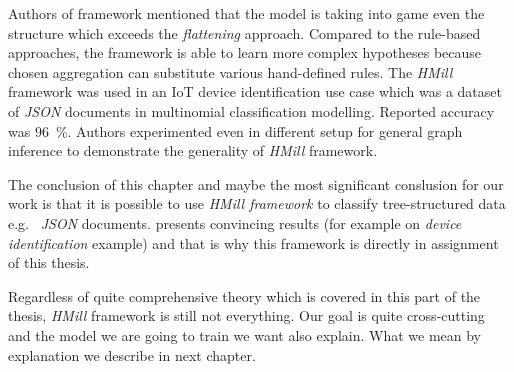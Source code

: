 
Authors of framework mentioned that the model is taking into game even the structure which exceeds the \emph{flattening} approach. Compared to the rule-based approaches, the framework is able to learn more complex hypotheses because chosen aggregation can substitute various hand-defined rules. The \emph{HMill} framework was used in an IoT device identification use case \cite{Mandlik2020} which was a dataset of \emph{JSON} documents in multinomial classification modelling. Reported accuracy was $96$~\%. Authors experimented even in different setup for general graph inference to demonstrate the generality of \emph{HMill} framework.

The conclusion of this chapter and maybe the most significant conslusion for our work is that it is possible to use \emph{HMill framework} to classify tree-structured data e.g. \ \emph{JSON} documents. \citeauthor{Mandlik2020} presents convincing results (for example on \emph{device identification} example) and that is why this framework is directly in assignment of this thesis.

Regardless of quite comprehensive theory which is covered in this part of the thesis, \emph{HMill} framework is still not everything. Our goal is quite cross-cutting and the model we are going to train we want also explain. What we mean by explanation we describe in next chapter.






